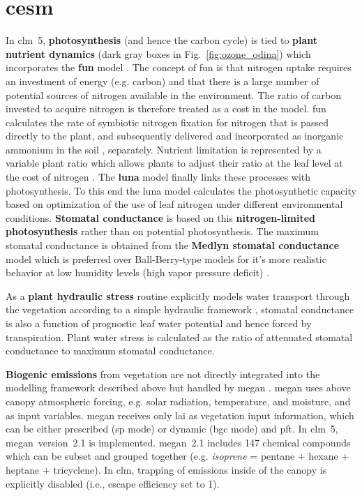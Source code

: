 \section{\gls{cesm}}
\label{sec:cesm}
In \gls{clm}~5, \textbf{photosynthesis} (and hence the {\color{darkgray}carbon cycle}) is tied to \textbf{\color{darkgray}plant nutrient dynamics} (dark gray boxes in Fig.~\ref{fig:ozone_odina}) which incorporates the \textbf{\gls{fun}} model \parencites{GBC:Fisher2010}{JGR:Brzostek2014}{GCB:Shi2015}. The concept of \gls{fun} is that nitrogen uptake requires an investment of energy (e.g. carbon) and that there is a large number of potential sources of nitrogen available in the environment. The ratio of carbon invested to acquire nitrogen is therefore treated as a cost in the model. \gls{fun} calculates the rate of symbiotic nitrogen fixation for nitrogen that is passed directly to the plant, and subsequently delivered and incorporated  as inorganic ammonium in the soil \parencite{GBC:Cleveland1999}, separately. Nutrient limitation is represented by a variable plant  ratio which allows plants to adjust their  ratio at the leaf level at the cost of nitrogen \parencite{JAMES:Ghimire2016}. The \textbf{\gls{luna}} model \parencites{STE:Xu2019}{GMD:Ali2016} finally links these processes with photosynthesis. To this end the \gls{luna} model calculates the photosynthetic capacity based on optimization of the use of leaf nitrogen under different environmental conditions. \textbf{Stomatal conductance} is based on this \textbf{nitrogen-limited photosynthesis} rather than on potential photosynthesis. The maximum stomatal conductance is obtained from the \textbf{Medlyn stomatal conductance} model \parencite{GCB:Medlyn2011} which is preferred over Ball-Berry-type models \parencite{BallBerry1987} for it’s more realistic behavior at low humidity levels (high vapor pressure deficit) \parencites{PR:Rogers2013}{NP:Rogers2017}.

As a \textbf{plant hydraulic stress} routine explicitly models water transport through the vegetation according to a simple hydraulic framework \parencite{JAMES:Kennedy2019}, stomatal conductance is also a function of prognostic leaf water potential and hence forced by transpiration. Plant water stress is calculated as the ratio of attenuated stomatal conductance to maximum stomatal conductance.

\textbf{Biogenic emissions} from vegetation are not directly integrated into the modelling framework described above but handled by \gls{megan} \parencite{ACP:Guenther2006}. \gls{megan} uses above canopy atmospheric forcing, e.g. solar radiation, temperature, and moisture, and \ch{[CO_2]} as input variables. \gls{megan} receives only \gls{lai} as vegetation input information, which can be either prescribed (\gls{sp} mode) or dynamic (\gls{bgc} mode) and \gls{pft}. In \gls{clm}~5, \gls{megan}~version~2.1 \parencite{GMD:Guenther2012} is implemented. \gls{megan}~2.1 includes 147 chemical compounds which can be subset and grouped together (e.g. \emph{isoprene} = pentane + hexane + heptane + tricyclene). In \gls{clm}, trapping of emissions inside of the canopy is explicitly disabled (i.e., escape efficiency set to 1).

